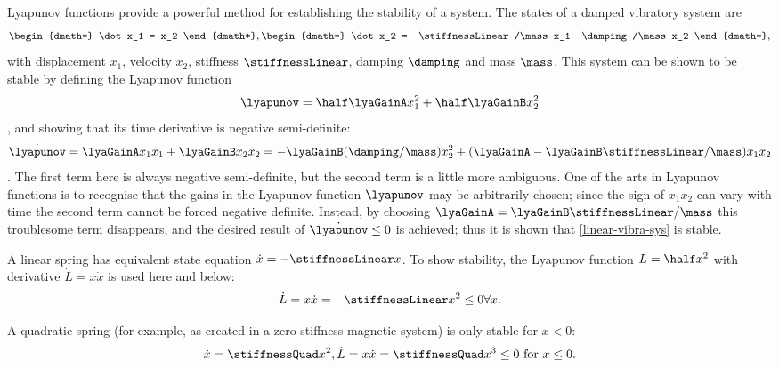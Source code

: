 Lyapunov functions provide a powerful method for establishing the
stability of a system. The states of a damped vibratory system are
\begin{dgroup}[label=linear-vibra-sys]
\begin{dmath*}
  \dot x_1 = x_2
\end{dmath*},
\begin{dmath*}
  \dot x_2 = -\stiffnessLinear/\mass x_1 -\damping/\mass x_2
\end{dmath*},
\end{dgroup}
with displacement $x_1$, velocity $x_2$, stiffness $\stiffnessLinear$, damping $\damping$
and mass $\mass$. This system can be shown to be stable by defining
the Lyapunov function
\begin{dmath}
  \lyapunov = \half \lyaGainA x_1^2 + \half \lyaGainB x_2^2
\end{dmath},
and showing that its time derivative is negative semi-definite:
\begin{dmath}
  \dot\lyapunov
   = \lyaGainA x_1 \dot x_1 + \lyaGainB x_2 \dot x_2
   = -\lyaGainB(\damping/\mass) x_2^2 +
      (\lyaGainA-\lyaGainB\stiffnessLinear/\mass) x_1 x_2
\end{dmath}.
The first term here is always negative semi-definite, but the second term is a
little more ambiguous. One of the arts in Lyapunov functions is to recognise
that the gains in the Lyapunov function $\lyapunov$ may be arbitrarily chosen;
since the sign of $x_1 x_2$ can vary with time the second term cannot be
forced negative definite. Instead, by choosing
$\lyaGainA=\lyaGainB\stiffnessLinear/\mass$ this troublesome term disappears,
and the desired result of $\dot\lyapunov\le0$ is achieved; thus it is shown
that \eqref{linear-vibra-sys} is stable.

A linear spring has equivalent state equation $\dot x = -\stiffnessLinear x$.
To show stability, the Lyapunov function $L=\half x^2$ with derivative $\dot L
= x \dot x$ is used here and below:
\begin{dmath}
  \dot L = x \dot x = -\stiffnessLinear x^2 \le 0 \forall x .
\end{dmath}

A quadratic spring (for example, as created in a zero stiffness
magnetic system) is only stable for $x<0$:
\begin{dmath}
  \dot x = \stiffnessQuad x^2 , \\
  \dot L = x \dot x = \stiffnessQuad x^3 \le 0 \text{~for~} x\le 0 .
\end{dmath}

